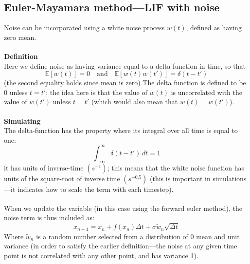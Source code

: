 \documentclass{report}
\begin{document}
\subsection{Euler-Mayamara method---LIF with noise}
Noise can be incorporated using a white noise process $w(t)$, defined as having zero mean.\\ 
\vspace{1mm}\\
\textbf{Definition}\\
Here we define noise as having variance equal to a delta function in time, so that
\begin{equation*}
\mathbb{E}[w(t)]=0\quad\text{and}\quad\mathbb{E}[w(t)w(t')]=\delta(t-t')
\end{equation*}
(the second equality holds since mean is zero)
The delta function is defined to be 0 unless $t=t'$; the idea here is that the value of $w(t)$ is uncorrelated with the value of $w(t')$ unless $t=t'$ 
(which would also mean that $w(t)=w(t')$).\\
\vspace{1mm}\\
\textbf{Simulating}\\
The delta-function has the property where its integral over all time is equal to one:
\begin{equation*}
\int^\infty_{-\infty}\delta(t-t')\,dt=1
\end{equation*}
it has units of inverse-time $(s^{-1})$; this means that the white noise function has units of the square-root of inverse time $(s^{-0.5})$ (this is important in
simulations---it indicates how to scale the term with each timestep). \\
\vspace{1mm}\\
When we update the variable (in this case using the forward euler method), 
the noise term is thus included as:
\begin{equation*}
x_{n+1}=x_n+f(x_n)\Delta t+\sigma\tilde{w}_n\sqrt{\Delta t}
\end{equation*}
Where $\tilde{w}_n$ is a random number selected from a distribution of 0 mean and unit variance (in order to satisfy the earlier definition---the noise at any given time point 
is not correlated with any other point, and has variance 1).
\end{document}
